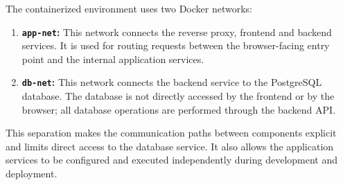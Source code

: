 The containerized environment uses two Docker networks:

\begin{enumerate}
\item \textbf{\texttt{app-net}:} This network connects the reverse proxy, frontend and backend services. It is used for routing requests between the browser-facing entry point and the internal application services.

\item \textbf{\texttt{db-net}:} This network connects the backend service to the PostgreSQL database. The database is not directly accessed by the frontend or by the browser; all database operations are performed through the backend API.

\end{enumerate}

This separation makes the communication paths between components explicit and limits direct access to the database service. It also allows the application services to be configured and executed independently during development and deployment.

